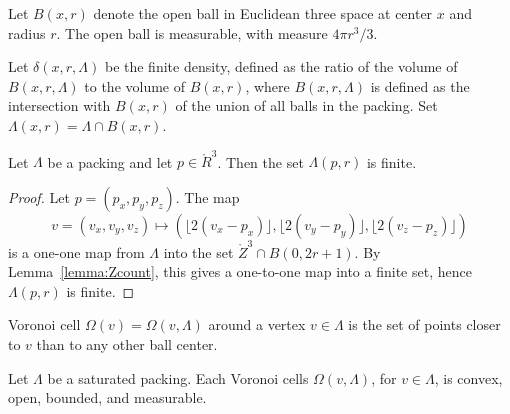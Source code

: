 



  Let $B(x,r)$ denote the open ball in
Euclidean three space at center $x$ and radius $r$.  The open ball
is measurable, with measure $4\pi r^3/3$.



Let $\delta(x,r,\Lambda)$ be the finite density, defined as the
ratio of the volume of $B(x,r,\Lambda)$ to the volume of $B(x,r)$,
where $B(x,r,\Lambda)$ is defined as the intersection with
$B(x,r)$ of the union of all balls in the packing. Set
$\Lambda(x,r) = \Lambda \cap
B(x,r)$.

\begin{lemma}\label{lemma:Lambda-finite}
Let $\Lambda$ be a packing and let $p\in\ring{R}^3$.
Then the set $\Lambda(p,r)$ is finite.
\end{lemma}

\begin{proof}  Let $p = (p_x,p_y,p_z)$. The map
$$v=(v_x,v_y,v_z)\mapsto (\lfloor 2(v_x-p_x)
\rfloor, \lfloor 2(v_y-p_y) \rfloor, \lfloor 2(v_z-p_z) \rfloor)$$
is a one-one map from $\Lambda$ into the set $\ring{Z}^3\cap B(0,2
r
 + 1)$.  By Lemma~\ref{lemma:Zcount}, this gives a one-to-one map
 into a finite set, hence $\Lambda(p,r)$ is finite.
\end{proof}

\begin{definition}\label{def:voronoi} Voronoi cell
$\Omega(v)=\Omega(v,\Lambda)$ around a
vertex $v\in \Lambda$ is the set of points closer to $v$ than to
any other ball center.
\end{definition}

\begin{lemma} Let $\Lambda$ be a saturated packing.
Each Voronoi cells $\Omega(v,\Lambda)$, for $v\in\Lambda$, is
convex, open, bounded, and measurable.
\end{lemma}

